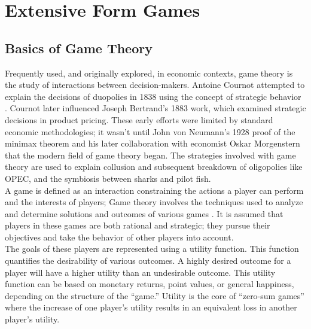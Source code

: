 \chapter{Extensive Form Games}
\section{Basics of Game Theory}
Frequently used, and originally explored, in economic contexts, game theory is the study of interactions between decision-makers. Antoine Cournot attempted to explain the decisions of duopolies in 1838 using the concept of strategic behavior \cite{webs14}. Cournot later influenced Joseph Bertrand's 1883 work, which examined strategic decisions in product pricing. These early efforts were limited by standard economic methodologies; it wasn't until John von Neumann's 1928 proof of the minimax theorem and his later collaboration with economist Oskar Morgenstern that the modern field of game theory began. The strategies involved with game theory are used to explain collusion and subsequent breakdown of oligopolies like OPEC, and the symbiosis between sharks and pilot fish.\\

A game is defined as an interaction constraining the actions a player can perform and the interests of players; Game theory involves the techniques used to analyze and determine solutions and outcomes of various games \cite{osbo94}. It is assumed that players in these games are both rational and strategic; they pursue their objectives and take the behavior of other players into account.\\

The goals of these players are represented using a utility function. This function quantifies the desirability of various outcomes. A highly desired outcome for a player will have a higher utility than an undesirable outcome. This utility function can be based on monetary returns, point values, or general happiness, depending on the structure of the ``game.'' Utility is the core of ``zero-sum games'' where the increase of one player's utility results in an equivalent loss in another player's utility.

